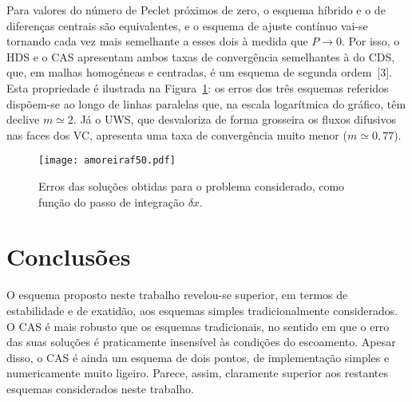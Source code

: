\documentclass[11pt,twoside]{article}
\begin{document}
{Para valores do número de Peclet próximos de zero, o esquema híbrido e o de diferenças centrais são equivalentes, e o esquema de ajuste contínuo vai-se tornando cada vez mais semelhante a esses dois à medida que $P\rightarrow0$. Por isso, o HDS e o CAS apresentam ambos taxas de convergência semelhantes à do CDS, que, em malhas homogéneas e centradas, é um esquema de segunda ordem~[3].  Esta propriedade é ilustrada na Figura~\ref{fig:50}: os erros dos três esquemas referidos dispõem-se ao longo de linhas paralelas que, na escala logarítmica do gráfico, têm declive $m\simeq2$. Já o UWS, que desvaloriza de forma grosseira os fluxos difusivos nas faces dos VC, apresenta uma taxa de convergência muito menor ($m\simeq0,\!77$).
\begin{figure}[!h]
\centering
\texttt{[image: amoreiraf50.pdf]}
\caption{Erros das soluções obtidas para o problema considerado, como função do passo de integração
$\delta x$. \label{fig:50}}
\end{figure}

%











\section{Conclusões}
O esquema proposto neste trabalho revelou-se superior, em termos de estabilidade e de exatidão, aos esquemas
simples tradicionalmente considerados. O CAS é mais robusto que os esquemas tradicionais, no sentido em que o
erro das suas soluções é praticamente insensível às condições do escoamento. Apesar disso, o CAS é ainda um esquema de dois pontos, de implementação simples e numericamente muito ligeiro. Parece, assim, claramente superior aos restantes esquemas considerados neste trabalho.





}
\end{document}
